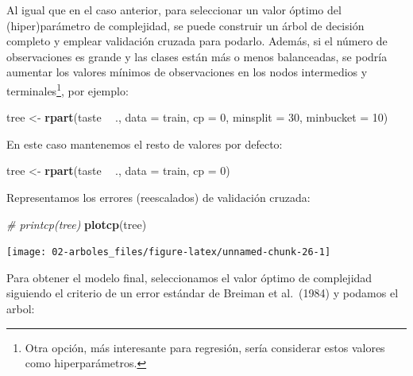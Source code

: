 \documentclass[
]{book}
\newenvironment{Shaded}{\begin{snugshade}}{\end{snugshade}}
\newcommand{\CommentTok}[1]{\textcolor[rgb]{0.56,0.35,0.01}{\textit{#1}}}
\newcommand{\DataTypeTok}[1]{\textcolor[rgb]{0.13,0.29,0.53}{#1}}
\newcommand{\DecValTok}[1]{\textcolor[rgb]{0.00,0.00,0.81}{#1}}
\newcommand{\KeywordTok}[1]{\textcolor[rgb]{0.13,0.29,0.53}{\textbf{#1}}}
\newcommand{\NormalTok}[1]{#1}
\newcommand{\OperatorTok}[1]{\textcolor[rgb]{0.81,0.36,0.00}{\textbf{#1}}}
\newcommand{\StringTok}[1]{\textcolor[rgb]{0.31,0.60,0.02}{#1}}
\theoremstyle{break}
\theoremstyle{definition}
\theoremstyle{definition}
\theoremstyle{definition}
\theoremstyle{remark}
\begin{document}
Al igual que en el caso anterior, para seleccionar un valor óptimo del (hiper)parámetro de complejidad, se puede construir un árbol de decisión completo y emplear validación cruzada para podarlo.
Además, si el número de observaciones es grande y las clases están más o menos balanceadas,
se podría aumentar los valores mínimos de observaciones en los nodos intermedios y terminales\footnote{Otra opción, más interesante para regresión, sería considerar estos valores como hiperparámetros.}, por ejemplo:

\begin{Shaded}
\begin{Highlighting}[]
\NormalTok{tree <-}\StringTok{ }\KeywordTok{rpart}\NormalTok{(taste }\OperatorTok{~}\StringTok{ }\NormalTok{., }\DataTypeTok{data =}\NormalTok{ train, }\DataTypeTok{cp =} \DecValTok{0}\NormalTok{, }\DataTypeTok{minsplit =} \DecValTok{30}\NormalTok{, }\DataTypeTok{minbucket =} \DecValTok{10}\NormalTok{)}
\end{Highlighting}
\end{Shaded}

En este caso mantenemos el resto de valores por defecto:

\begin{Shaded}
\begin{Highlighting}[]
\NormalTok{tree <-}\StringTok{ }\KeywordTok{rpart}\NormalTok{(taste }\OperatorTok{~}\StringTok{ }\NormalTok{., }\DataTypeTok{data =}\NormalTok{ train, }\DataTypeTok{cp =} \DecValTok{0}\NormalTok{)}
\end{Highlighting}
\end{Shaded}

Representamos los errores (reescalados) de validación cruzada:

\begin{Shaded}
\begin{Highlighting}[]
\CommentTok{# printcp(tree)}
\KeywordTok{plotcp}\NormalTok{(tree)}
\end{Highlighting}
\end{Shaded}

\begin{center}\texttt{[image: 02-arboles\_files/figure-latex/unnamed-chunk-26-1]} \end{center}

Para obtener el modelo final, seleccionamos el valor óptimo de complejidad siguiendo el criterio de un error estándar de Breiman et al.~(1984) y podamos el arbol:
\end{document}
